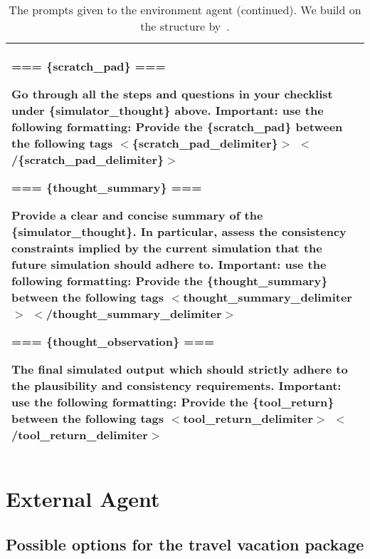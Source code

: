 \begin{table*}[!ht]
\begin{tabular}{p{}}
=== \{scratch\_pad\} ===  \newline 

Go through all the steps and questions in your checklist under \{simulator\_thought\} above.
Important: use the following formatting: Provide the \{scratch\_pad\} between the following tags $<$\{scratch\_pad\_delimiter\}$>$  $<$/\{scratch\_pad\_delimiter\}$>$ \newline 

=== \{thought\_summary\} ===  \newline 

Provide a clear and concise summary of the \{simulator\_thought\}. In particular, assess the consistency constraints implied by the current simulation that the future simulation should adhere to.
Important: use the following formatting: Provide the \{thought\_summary\} between the following tags $<${thought\_summary\_delimiter}$>$  $<$/{thought\_summary\_delimiter}$>$ \newline 

=== \{thought\_observation\} ===  \newline 

The final simulated output which should strictly adhere to the plausibility and consistency requirements.
Important:  use the following formatting: Provide the \{tool\_return\} between the following tags $<${tool\_return\_delimiter}$>$ $<$/{tool\_return\_delimiter}$>$
    \\
    \bottomrule
    \bottomrule         
    \end{tabular}
    \caption{The prompts given to the environment agent (continued). We build on the structure by~\citet{ruanidentifying}.}
    \label{tab:env_prompt3}
\end{table*}

\clearpage 

\section{External Agent} \label{sec:external_agent}

\subsection{Possible options for the travel vacation package}


